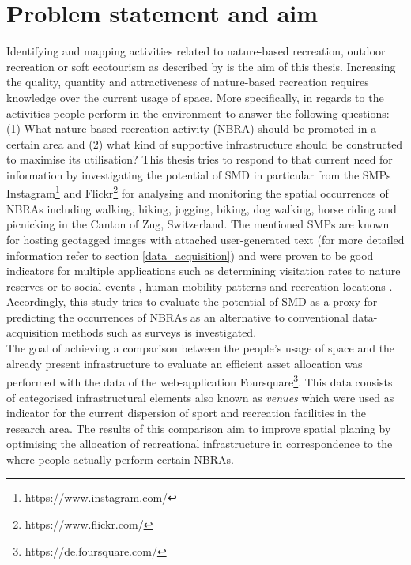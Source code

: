 \section{Problem statement and aim}
Identifying and mapping activities related to nature-based recreation, outdoor recreation or soft ecotourism as described by \textcite{Deng2002, Balmford2009} is the aim of this thesis.
Increasing the quality, quantity and attractiveness of nature-based recreation requires knowledge over the current usage of space. More specifically, in regards to the activities people perform in the environment to answer the following questions: (1) What nature-based recreation activity (NBRA) should be promoted in a certain area and (2) what kind of supportive infrastructure should be constructed to maximise its utilisation? This thesis tries to respond to that current need for information by investigating the potential of SMD in particular from the SMPs Instagram\footnote{https://www.instagram.com/} and Flickr\footnote{https://www.flickr.com/} for analysing and monitoring the spatial occurrences of NBRAs including walking, hiking, jogging, biking, dog walking, horse riding and picnicking in the Canton of Zug, Switzerland. The mentioned SMPs are known for hosting geotagged images with attached user-generated text (for more detailed information refer to section \ref{data_acquisition}) and were proven to be good indicators for multiple applications such as determining visitation rates to nature reserves \parencite{Tenkanen2017, Heikinheimo2017, Keeler2015, Wood2013} or to social events \parencite{Pettersson2011}, human mobility patterns \parencite{Barchiesi2015, Grossenbacher2014} and recreation locations \parencite{Weyland2014, Hill2006, Neuvonen2010}.
Accordingly, this study tries to evaluate the potential of SMD as a proxy for predicting the occurrences of NBRAs as an alternative to conventional data-acquisition methods such as surveys is investigated.\\
The goal of achieving a comparison between the people's usage of space and the already present infrastructure to evaluate an efficient asset allocation was performed with the data of the web-application Foursquare\footnote{https://de.foursquare.com/}. This data consists of categorised infrastructural elements also known as \textit{venues} which were used as indicator for the current dispersion of sport and recreation facilities in the research area. The results of this comparison aim to improve spatial planing by optimising the allocation of recreational infrastructure in correspondence to the where people actually perform certain NBRAs.

